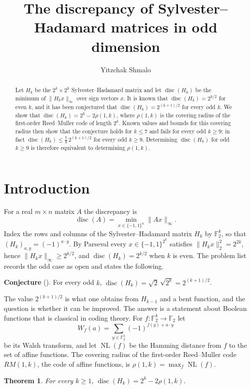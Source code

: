 \documentclass[11pt]{amsart}
\title{The discrepancy of Sylvester--Hadamard matrices in odd dimension}
\author{Yitzchak Shmalo}
\date{}
\newtheorem{theorem}{Theorem}
\theoremstyle{remark}
\newcommand{\F}{\mathbb{F}_2}
\newcommand{\disc}{\operatorname{disc}}
\newcommand{\NL}{\operatorname{NL}}
\begin{document}
\begin{abstract}
Let $H_k$ be the $2^k\times 2^k$ Sylvester--Hadamard matrix and let
$\disc(H_k)$ be the minimum of $\|H_kx\|_\infty$ over sign vectors $x$. It is known that
$\disc(H_k)=2^{k/2}$ for even $k$, and it has been conjectured that
$\disc(H_k)=2^{(k+1)/2}$ for every odd $k$. We show that
$\disc(H_k)=2^k-2\rho(1,k)$, where $\rho(1,k)$ is the covering radius of the
first-order Reed--Muller code of length $2^k$. Known values and bounds for this
covering radius then show that the conjecture holds for $k\le 7$ and fails for
every odd $k\ge 9$; in fact $\disc(H_k)\le \tfrac78\,2^{(k+1)/2}$ for every odd
$k\ge 9$. Determining $\disc(H_k)$ for odd $k\ge 9$ is therefore equivalent to
determining $\rho(1,k)$.
\end{abstract}

\maketitle

\section{Introduction}

For a real $m\times n$ matrix $A$ the discrepancy is
\[
\disc(A)=\min_{x\in\{-1,1\}^n}\|Ax\|_\infty .
\]
Index the rows and columns of the Sylvester--Hadamard matrix $H_k$ by $\F^k$,
so that $(H_k)_{a,y}=(-1)^{a\cdot y}$. By Parseval every $x\in\{-1,1\}^{2^k}$
satisfies $\|H_kx\|_2^2=2^{2k}$, hence $\|H_kx\|_\infty\ge 2^{k/2}$, and
$\disc(H_k)=2^{k/2}$ when $k$ is even. The problem list \cite{RS101} records the
odd case as open and states the following.

\medskip
\noindent\textbf{Conjecture} (\cite[Conjecture 13]{RS101}).
For every odd $k$, $\disc(H_k)=\sqrt2\,\sqrt{2^k}=2^{(k+1)/2}$.
\medskip

The value $2^{(k+1)/2}$ is what one obtains from $H_{k-1}$ and a bent function,
and the question is whether it can be improved. The answer is a statement about
Boolean functions that is classical in coding theory. For $f\colon\F^k\to\F$ let
\[
W_f(a)=\sum_{y\in\F^k}(-1)^{f(y)+a\cdot y}
\]
be its Walsh transform, and let $\NL(f)$ be the Hamming distance from $f$ to the
set of affine functions. The covering radius of the first-order Reed--Muller code
$RM(1,k)$, the code of affine functions, is $\rho(1,k)=\max_f\NL(f)$.

\begin{theorem}\label{thm:main}
For every $k\ge1$, $\disc(H_k)=2^k-2\rho(1,k)$.
\end{theorem}
\end{document}
